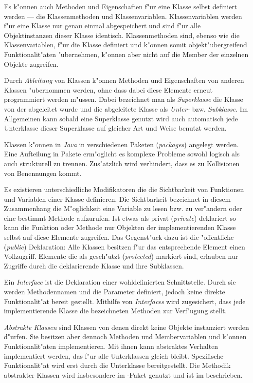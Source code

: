 Es k"onnen auch Methoden und Eigenschaften f"ur eine Klasse selbst definiert werden --- die Klassenmethoden und Klassenvariablen.
Klassenvariablen werden f"ur eine Klasse nur genau einmal abgespeichert und sind f"ur alle Objektinstanzen dieser Klasse identisch.
Klassenmethoden sind, ebenso wie die Klassenvariablen, f"ur die Klasse definiert und k"onnen somit objekt"ubergreifend Funktionalit"aten "ubernehmen, k"onnen aber nicht auf die Member der einzelnen Objekte zugreifen.

Durch \emph{Ableitung} von Klassen k"onnen Methoden und Eigenschaften von anderen Klassen "ubernommen werden, ohne dass dabei diese Elemente erneut programmiert werden m"ussen.
Dabei bezeichnet man als \emph{Superklasse} die Klasse von der abgeleitet wurde und die abgeleitete Klasse als \emph{Unter-} bzw. \emph{Subklasse}.
Im Allgemeinen kann sobald eine Superklasse genutzt wird auch automatisch jede Unterklasse dieser Superklasse auf gleicher Art und Weise benutzt werden.

Klassen k"onnen in \emph{Java} in verschiedenen Paketen (\emph{packages}) angelegt werden.
Eine Aufteilung in Pakete erm"oglicht es komplexe Probleme sowohl logisch als auch strukturell zu trennen.
Zus"atzlich wird verhindert, dass es zu Kollisionen von Benennungen kommt.

Es existieren unterschiedliche Modifikatoren die die Sichtbarkeit von Funktionen und Variablen einer Klasse definieren.
Die Sichtbarkeit bezeichnet in diesem Zusammenhang die M"oglichkeit eine Variable zu lesen bzw. zu ver"andern oder eine bestimmt Methode aufzurufen.
Ist etwas als privat (\emph{private}) deklariert so kann die Funktion oder Methode nur Objekten der implementierenden Klasse selbst auf diese Elemente zugreifen.
Das Gegenst"uck dazu ist die "offentliche (\emph{public}) Deklaration: Alle Klassen besitzen f"ur das entsprechende Element einen Vollzugriff.
Elemente die als gesch"utzt (\emph{protected}) markiert sind, erlauben nur Zugriffe durch die deklarierende Klasse und ihre Subklassen.

Ein \emph{Interface} ist die Deklaration einer wohldefinierten Schnittstelle.
Durch sie werden Methodennamen und die Parameter definiert, jedoch keine direkte Funktionalit"at bereit gestellt.
Mithilfe von \emph{Interfaces} wird zugesichert, dass jede implementierende Klasse die bezeichneten Methoden zur Verf"ugung stellt.

\emph{Abstrakte Klassen} sind Klassen von denen direkt keine Objekte instanziert werden d"urfen.
Sie besitzen aber dennoch Methoden und Membervariablen und k"onnen Funktionalit"aten implementieren.
Mit ihnen kann abstraktes Verhalten implementiert werden, das f"ur alle Unterklassen gleich bleibt.
Spezifische Funktionalit"at wird erst durch die Unterklasse bereitgestellt.
Die Methodik abstrakter Klassen wird insbesondere im -Paket genutzt und ist im  beschrieben.

\cite{Barnes2003a}

